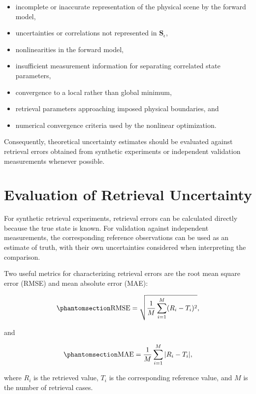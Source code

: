 \documentclass[
  11pt,
  letterpaper,
]{scrreprt}
\providecommand{\tightlist}{%
  \setlength{\itemsep}{0pt}\setlength{\parskip}{0pt}}
\begin{document}
\begin{itemize}
\tightlist
\item
  incomplete or inaccurate representation of the physical scene by the
  forward model,
\item
  uncertainties or correlations not represented in
  \(\mathbf{S}_{\epsilon}\),
\item
  nonlinearities in the forward model,
\item
  insufficient measurement information for separating correlated state
  parameters,
\item
  convergence to a local rather than global minimum,
\item
  retrieval parameters approaching imposed physical boundaries, and
\item
  numerical convergence criteria used by the nonlinear optimization.
\end{itemize}

Consequently, theoretical uncertainty estimates should be evaluated
against retrieval errors obtained from synthetic experiments or
independent validation measurements whenever possible.

\section{Evaluation of Retrieval
Uncertainty}\label{evaluation-of-retrieval-uncertainty}

For synthetic retrieval experiments, retrieval errors can be calculated
directly because the true state is known. For validation against
independent measurements, the corresponding reference observations can
be used as an estimate of truth, with their own uncertainties considered
when interpreting the comparison.

Two useful metrics for characterizing retrieval errors are the root mean
square error (RMSE) and mean absolute error (MAE):

\begin{equation}\phantomsection\label{eq-uq-rmse}{
\mathrm{RMSE}
=
\sqrt{
\frac{1}{M}
\sum_{i=1}^{M}
(R_i-T_i)^2
},
}\end{equation}

and

\begin{equation}\phantomsection\label{eq-uq-mae}{
\mathrm{MAE}
=
\frac{1}{M}
\sum_{i=1}^{M}
|R_i-T_i|,
}\end{equation}

where \(R_i\) is the retrieved value, \(T_i\) is the corresponding
reference value, and \(M\) is the number of retrieval cases.
\end{document}
